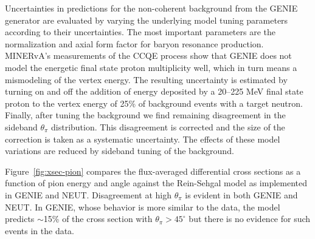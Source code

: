 \documentclass[aps,prl,twocolumn,showpacs,superscriptaddress,nofootinbib]{revtex4}
\newcommand{\nubar}{\ensuremath{\bar{\nu}}}
\begin{document}
Uncertainties in predictions for the non-coherent background from the
GENIE generator are evaluated by 
varying the
underlying model tuning parameters according to their
uncertainties\cite{Andreopoulos201087}.  The most important
parameters are the normalization and axial form factor for baryon resonance production.  MINERvA's measurements of the CCQE
process\cite{nubarprl,nuprl} show that GENIE does
not model the energetic final state proton multiplicity well, which in turn means a
mismodeling of the vertex energy.  The resulting uncertainty is estimated by
turning on and off the addition of energy deposited by a 20--225 MeV final state proton to
the vertex energy of 25\% of background events with a target neutron.
Finally, after tuning the background we find remaining disagreement in the
sideband $\theta_\pi$ distribution.  This disagreement is corrected and 
the size of the correction is taken as a systematic uncertainty.
The effects of these model variations are reduced by
sideband tuning of the background.


Figure~\ref{fig:xsec-pion} compares the flux-averaged
 differential cross sections as a function
of pion energy and angle against the Rein-Sehgal
model\cite{Rein:1982pf} as implemented in GENIE\cite{Rein:2006di,Andreopoulos201087} and NEUT\cite{Hayato:2009zz}.  Disagreement at high $\theta_\pi$ is evident in both GENIE and NEUT.  In GENIE, whose behavior is more similar to the data, the model predicts $\sim$15\% of the cross section with $\theta_\pi>45^\circ$ but there is no evidence for such events in the data.
\end{document}
